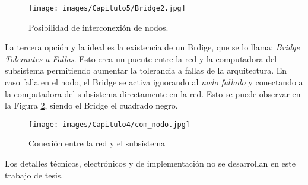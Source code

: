 \begin{figure}[h!]
 \centering
 \texttt{[image: images/Capitulo5/Bridge2.jpg]}
  \caption{Posibilidad de interconexión de nodos.}
\label{fig:Bridge2}
\end{figure} 

La tercera opción y la ideal es la existencia de un Brdige, que se lo llama: 
\textit{Bridge Tolerantes a Fallas}. Esto crea un puente entre la red y la computadora
del subsistema permitiendo aumentar la tolerancia a fallas de la arquitectura. En 
caso falla en el nodo, el Bridge se activa ignorando al \textit{nodo fallado} y 
conectando a la computadora del subsistema directamente en la red.  Esto se puede observar
en la Figura \ref{fig:conn_prop}, siendo el Bridge el cuadrado negro.

\begin{figure}[h!]
 \centering
 \texttt{[image: images/Capitulo4/com\_nodo.jpg]}
 \caption{Conexión entre la red y el subsistema}
\label{fig:conn_prop}
\end{figure}

Los detalles técnicos, electrónicos y de implementación no se desarrollan en
este trabajo de tesis. 

